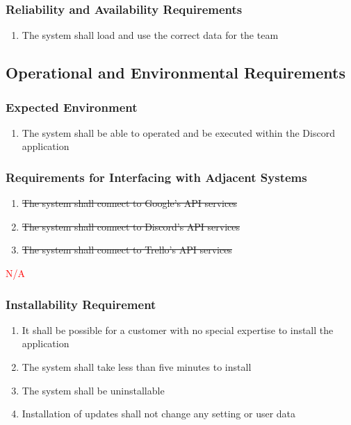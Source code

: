 \documentclass[12pt, titlepage]{article}
\begin{document}
\subsubsection{Reliability and Availability Requirements}
\begin{enumerate}[start=4, label={P\arabic*.}]
    \item The system shall load and use the correct data for the team
\end{enumerate}

\subsection{Operational and Environmental Requirements}
\subsubsection{Expected Environment}
\begin{enumerate}[start=1, label={OE\arabic*.}]
    \item The system shall be able to operated and be executed within the Discord application
\end{enumerate}
\subsubsection{Requirements for Interfacing with Adjacent Systems}
\begin{enumerate}[start=2, label={OE\arabic*.}]
    \item \sout{The system shall connect to Google's API services}
    \item \sout{The system shall connect to Discord's API services}
    \item \sout{The system shall connect to Trello's API services}
\end{enumerate}
\textcolor{red}{N/A}

\subsubsection{Installability Requirement}
\begin{enumerate}[start=5, label={OE\arabic*.}]
    \item It shall be possible for a customer with no special expertise to install the application
    \item The system shall take less than five minutes to install
    \item The system shall be uninstallable
    \item Installation of updates shall not change any setting or user data
\end{enumerate}
\end{document}
